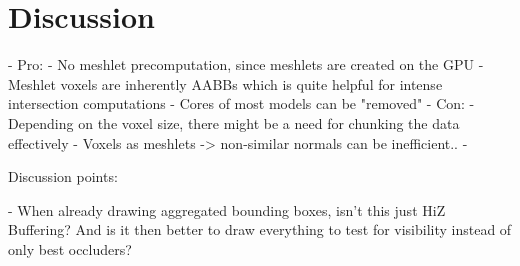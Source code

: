 \chapter{Discussion} \label{cpt-discussion}


- Pro: 
    - No meshlet precomputation, since meshlets are created on the GPU
    - Meshlet voxels are inherently AABBs which is quite helpful for intense intersection computations %
    - Cores of most models can be "removed"
- Con:
    - Depending on the voxel size, there might be a need for chunking the data effectively %
    - Voxels as meshlets -> non-similar normals can be inefficient.. 
    - 


Discussion points:

- When already drawing aggregated bounding boxes, isn't this just HiZ Buffering? And is it then better to draw everything
 to test for visibility instead of only best occluders? 